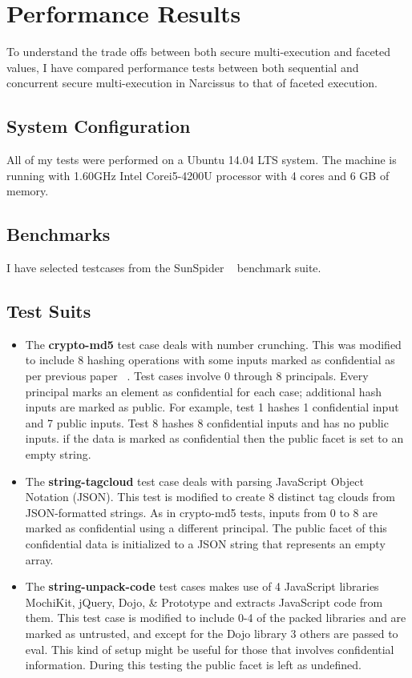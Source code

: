 \chapter{Performance Results}

To understand the trade offs between both secure multi-execution and faceted values, I have compared performance tests between both sequential and concurrent secure multi-execution in Narcissus to that of faceted execution.

\section{System Configuration} 
All of my tests were performed on a Ubuntu 14.04 LTS system. The machine is running with 1.60GHz Intel Corei5-4200U processor with 4 cores and 6 GB of memory. 

\section{Benchmarks}
I have selected testcases from the SunSpider ~\cite{Webkit} benchmark suite.

\section{Test Suits}
\begin{itemize}

\item{The \textbf{crypto-md5} test case deals with number crunching. This was modified to include 8 hashing operations with some inputs marked as confidential as per previous paper ~\cite{bib4}. Test cases involve 0 through 8 principals. Every principal marks an element as confidential for each case; additional hash inputs are marked as public. For example, test 1 hashes 1 confidential input and 7 public inputs. Test 8 hashes 8 confidential inputs and has no public inputs. if the data is marked as confidential then the public facet is set to an empty string.}
\item{The \textbf{string-tagcloud} test case deals with parsing JavaScript Object Notation (JSON). This test is modified to create 8 distinct tag clouds from JSON-formatted strings. As in crypto-md5 tests, inputs from 0 to 8 are marked as confidential using a different principal. The public facet of this confidential data is initialized to a JSON string that represents an empty array.}
\item{The \textbf{string-unpack-code} test cases makes use of 4 JavaScript libraries MochiKit, jQuery, Dojo, \& Prototype and extracts JavaScript code from them. This test case is modified to include 0-4 of the packed libraries and are marked as untrusted, and except for the Dojo library 3 others are passed to eval. This kind of setup might be useful for those that involves confidential information. During this testing the public facet is left as undefined.}

\end{itemize}

